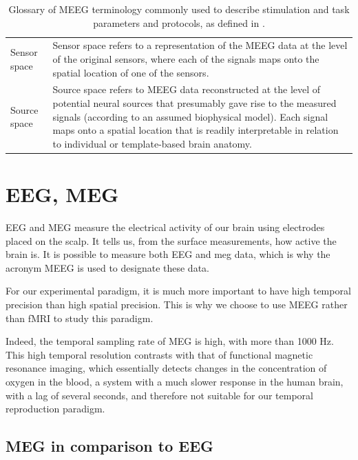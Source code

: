 \begin{table}[ht]
\begin{tabular}{@{}| p{3cm}|p{10cm}| @{}}
      Sensor space & Sensor space refers to a representation of the MEEG data at the level of the original sensors, where each of the signals maps onto the spatial location of one of the sensors.                                                                                                                                           \\
      Source space & Source space refers to MEEG data reconstructed at the level of potential neural sources that presumably gave rise to the measured signals (according to an assumed biophysical model). Each signal maps onto a spatial location that is readily interpretable in relation to individual or template-based brain anatomy. \\
      \hline
   \end{tabular}
   \caption[Glossary of MEEG terminology commonly used to describe stimulation and task parameters and protocol.]%
   {Glossary of MEEG terminology commonly used to describe stimulation and task parameters and protocols, as defined in \cite{pernet2018best}.}

   \label{Tab:Glossary_protocol}
\end{table}



\section{EEG, MEG}

EEG and MEG measure the electrical activity of our brain using electrodes placed on the scalp. It tells us, from the surface measurements, how active the brain is. It is possible to measure both EEG and meg data, which is why the acronym MEEG is used to designate these data.

For our experimental paradigm, it is much more important to have high temporal precision than high spatial precision. This is why we choose to use MEEG rather than fMRI to study this paradigm.

Indeed, the temporal sampling rate of MEG is high, with more than 1000 Hz. This high temporal resolution contrasts with that of functional magnetic resonance imaging, which essentially detects changes in the concentration of oxygen in the blood, a system with a much slower response in the human brain, with a lag of several seconds, and therefore not suitable for our temporal reproduction paradigm.


\subsection{MEG in comparison to EEG}

